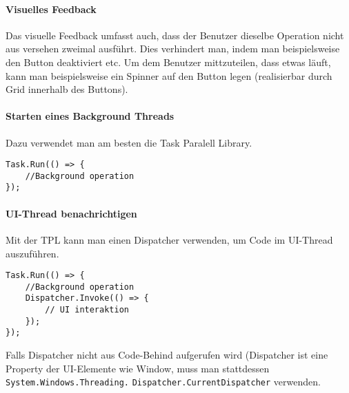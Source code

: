 \paragraph{Visuelles Feedback} Das visuelle Feedback umfasst auch, dass der Benutzer dieselbe Operation nicht aus versehen zweimal ausführt. Dies verhindert man, indem man beispielsweise den Button deaktiviert etc. Um dem Benutzer mittzuteilen, dass etwas läuft, kann man beispielsweise ein Spinner auf den Button legen (realisierbar durch Grid innerhalb des Buttons). 
\paragraph{Starten eines Background Threads} Dazu verwendet man am besten die Task Paralell Library. 
\begin{lstlisting}
Task.Run(() => {
    //Background operation
});
\end{lstlisting}
\paragraph{UI-Thread benachrichtigen} Mit der TPL kann man einen Dispatcher verwenden, um Code im UI-Thread auszuführen.
\begin{lstlisting}
Task.Run(() => {
    //Background operation
    Dispatcher.Invoke(() => {
        // UI interaktion
    });
});
\end{lstlisting}
Falls Dispatcher nicht aus Code-Behind aufgerufen wird (Dispatcher ist eine Property der UI-Elemente wie Window, muss man stattdessen \verb+System.Windows.Threading.+
\verb+Dispatcher.CurrentDispatcher+ verwenden.